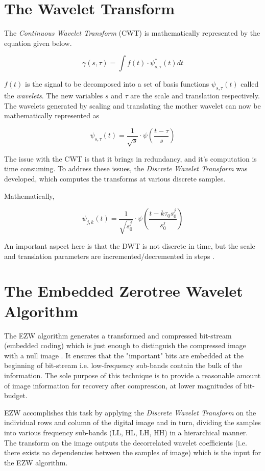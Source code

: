 \documentclass[./A14_Report.tex]{subfiles}
\begin{document}
\section{The Wavelet Transform}%
\label{sec:the_wavelet_transform}

The \textit{Continuous Wavelet Transform} (CWT) is mathematically represented by the
equation given below.

\[\gamma(s, \tau) = \int f(t)\cdot\psi^{*}_{s, \tau}(t)dt\]

\(f(t)\) is the signal to be decomposed into a set of basis functions \(\psi_{s,\tau}(t)\)
called the \textit{wavelets}. The new variables \(s\) and $\tau$ are the scale and translation
respectively. The wavelets generated by scaling and translating the mother wavelet
can now be mathematically represented as

$$\psi_{s,\tau}(t)=\frac{1}{\sqrt{s}}\cdot\psi \left (\frac{t-\tau}{s} \right)$$

The issue with the CWT is that it brings in redundancy, and it's computation is time consuming.
To address these issues, the \textit{Discrete Wavelet Transform} was developed, 
which computes the transforms at various discrete samples.

Mathematically,

$$\psi_{j,k}(t) = \frac{1}{\sqrt{s_{0}^j}} \cdot \psi \left (\frac{t - k \tau_{0}s_{0}^j}{s_{0}^j} \right )$$

An important aspect here is that the DWT is not discrete in time, but the scale and 
translation parameters are incremented/decremented in steps \cite{valwav1999}. 

\section{The Embedded Zerotree Wavelet Algorithm}%
\label{sec:the_embedded_zerotree_wavelet_algorithm}

The EZW algorithm generates a transformed and compressed bit-stream (embedded
coding) which is just enough to distinguish the compressed image with a null
image \cite{shap1993}. It ensures that the "important" bits are embedded at the
beginning of bit-stream i.e. low-frequency sub-bands contain the bulk of the
information. The sole purpose of this technique is to provide a reasonable
amount of image information for recovery after compression, at lower magnitudes
of bit-budget.

\par

EZW accomplishes this task by applying the \textit{Discrete Wavelet Transform}
on the individual rows and column of the digital image and in turn, dividing
the samples into various frequency sub-bands (LL, HL, LH, HH) in a hierarchical
manner. The transform on the image outputs the decorrelated wavelet
coefficients (i.e. there exists no dependencies between the samples of image)
which is the input for the EZW algorithm.
\end{document}

